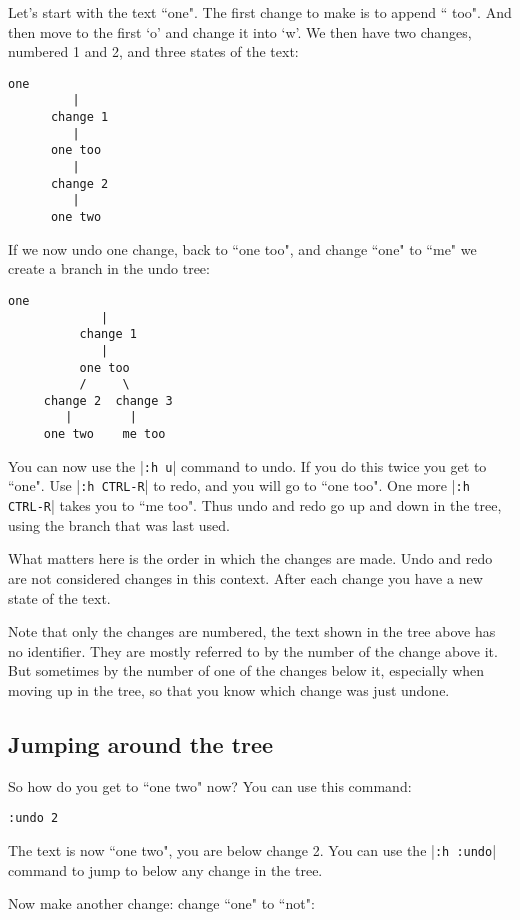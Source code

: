 Let's start with the text ``one".
The first change to make is to append `` too".
And then move to the first `o' and change it into `w'.
We then have two changes, numbered 1 and 2, and three states of the text:

\begin{Verbatim}[samepage=true]
        one 
         |
      change 1
         |
      one too 
         |
      change 2
         |
      one two 
\end{Verbatim}

If we now undo one change, back to ``one too", and change ``one" to ``me" we create a branch in the undo tree:

\begin{Verbatim}[samepage=true]
            one 
             |
          change 1
             |
          one too 
          /     \
     change 2  change 3
        |        |
     one two    me too 
\end{Verbatim}

You can now use the |\texttt{:h u}| command to undo.
If you do this twice you get to ``one".
Use |\texttt{:h CTRL-R}| to redo, and you will go to ``one too".
One more |\texttt{:h CTRL-R}| takes you to ``me too".
Thus undo and redo go up and down in the tree, using the branch that was last used.

What matters here is the order in which the changes are made.
Undo and redo are not considered changes in this context.
After each change you have a new state of the text.

Note that only the changes are numbered, the text shown in the tree above has no identifier.
They are mostly referred to by the number of the change above it.
But sometimes by the number of one of the changes below it, especially when moving up in the tree, so that you know which change was just undone.
\subsection{Jumping around the tree}
So how do you get to ``one two" now?  You can use this command:

\begin{Verbatim}[samepage=true]
 :undo 2
\end{Verbatim}

The text is now ``one two", you are below change 2.
You can use the |\texttt{:h :undo}| command to jump to below any change in the tree.

Now make another change: change ``one" to ``not":

